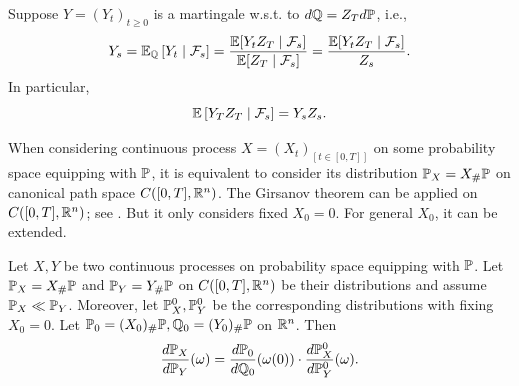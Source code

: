 \begin{rmk}
    Suppose $Y=(Y_t)_{t \geq 0}$ is a martingale w.s.t. to $d\mathbb{Q} = Z_T d\mathbb{P}$, i.e.,
    \begin{equation*}
        Y_s = \mathbb{E}_{\mathbb{Q}}\left[Y_t \mid \mathcal{F}_s\right] = \frac{\mathbb{E}[Y_tZ_T \mid \mathcal{F}_s]}{\mathbb{E}[Z_T \mid \mathcal{F}_s]} = \frac{\mathbb{E}[Y_tZ_T \mid \mathcal{F}_s]}{Z_s}.
    \end{equation*}
    In particular,
    \begin{equation*}
        \mathbb{E}\left[Y_TZ_T \mid \mathcal{F}_s\right] = Y_sZ_s.
    \end{equation*}
\end{rmk}


When considering continuous process $X = (X_t)_{[t \in [0,T]]}$ on some probability space equipping with $\mathbb{P}$, it is equivalent to consider its distribution $\mathbb{P}_X = X_{\#}\mathbb{P}$ on canonical path space $C([0,T],\mathbb{R}^n)$. The Girsanov theorem can be applied on $C([0,T],\mathbb{R}^n)$; see \cite{liptser2013statistics}. But it only considers fixed $X_0 = 0$. For general $X_0$, it can be extended.
\begin{prop}
    Let $X,Y$ be two continuous processes on probability space equipping with $\mathbb{P}$. Let $\mathbb{P}_X = X_{\#}\mathbb{P}$ and $\mathbb{P}_Y = Y_{\#}\mathbb{P}$ on $C([0,T],\mathbb{R}^n)$ be their distributions and assume $\mathbb{P}_X \ll \mathbb{P}_Y$. Moreover, let $\mathbb{P}_X^0,\mathbb{P}_Y^0$ be the corresponding distributions with fixing $X_0 = 0$. Let $\mathbb{P}_0 = (X_0)_{\#}\mathbb{P}, \mathbb{Q}_0 = (Y_0)_{\#}\mathbb{P}$ on $\mathbb{R}^n$. Then
    \begin{equation*}
        \frac{d\mathbb{P}_X}{d\mathbb{P}_Y}(\omega) = \frac{d\mathbb{P}_0}{d\mathbb{Q}_0}(\omega(0))\cdot \frac{d\mathbb{P}^0_X}{d\mathbb{P}^0_Y}(\omega).
    \end{equation*}
\end{prop}
